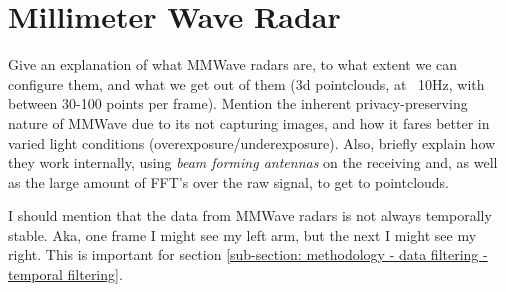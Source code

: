 \section{Millimeter Wave Radar}
\label{section: background - millimeter wave radar}
Give an explanation of what MMWave radars are, to what extent we can configure them, and what we get out of them (3d pointclouds, at ~10Hz, with between 30-100 points per frame).
Mention the inherent privacy-preserving nature of MMWave due to its not capturing images, and how it fares better in varied light conditions (overexposure/underexposure).
Also, briefly explain how they work internally, using \textit{beam forming antennas} on the receiving and, as well as the large amount of FFT's over the raw signal, to get to pointclouds.

I should mention that the data from MMWave radars is not always temporally stable.
Aka, one frame I might see my left arm, but the next I might see my right.
This is important for section \cref{sub-section: methodology - data filtering - temporal filtering}.

